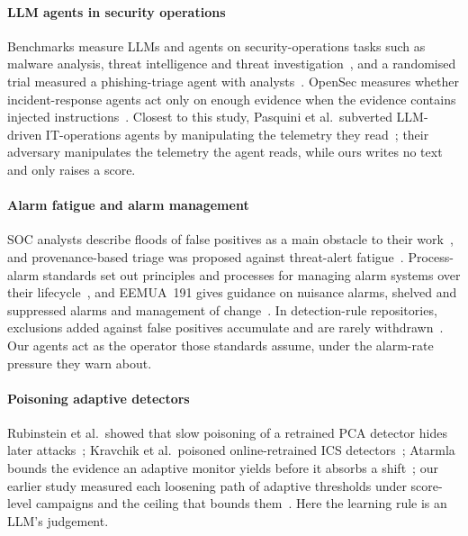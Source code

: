 \documentclass[sigconf]{acmart}
\begin{document}
\paragraph{LLM agents in security operations}
Benchmarks measure LLMs and agents on security-operations tasks such as malware analysis, threat
intelligence and threat investigation~\cite{deason2025cybersoceval, wu2026excytin}, and a randomised trial
measured a phishing-triage agent with analysts~\cite{bono2025rct}. OpenSec measures whether incident-response
agents act only on enough evidence when the evidence contains injected instructions~\cite{barnes2026opensec}.
Closest to this study, Pasquini et al.\ subverted LLM-driven IT-operations agents by manipulating the
telemetry they read~\cite{pasquini2026aiops}; their adversary manipulates the telemetry the agent reads,
while ours writes no text and only raises a score.

\paragraph{Alarm fatigue and alarm management}
SOC analysts describe floods of false positives as a main obstacle to their work~\cite{alahmadi2022falsepositives},
and provenance-based triage was proposed against threat-alert fatigue~\cite{hassan2019nodoze}. Process-alarm
standards set out principles and processes for managing alarm systems over their
lifecycle~\cite{isa182, iec62682}, and EEMUA~191 gives guidance on nuisance alarms, shelved and suppressed
alarms and management of change~\cite{eemua191}. In detection-rule repositories, exclusions added against false
positives accumulate and are rarely withdrawn~\cite{dhananjeyan2026ratchet}. Our agents act as the operator
those standards assume, under the alarm-rate pressure they warn about.

\paragraph{Poisoning adaptive detectors}
Rubinstein et al.\ showed that slow poisoning of a retrained PCA detector hides later
attacks~\cite{rubinstein2009antidote}; Kravchik et al.\ poisoned online-retrained ICS
detectors~\cite{kravchik2021poisoning}; Atarmla bounds the evidence an adaptive monitor yields before it
absorbs a shift~\cite{atarmla2026price}; our earlier study measured each loosening path of adaptive
thresholds under score-level campaigns and the ceiling that bounds them~\cite{kulshrestha2026tt1}. Here the
learning rule is an LLM's judgement.
\end{document}
